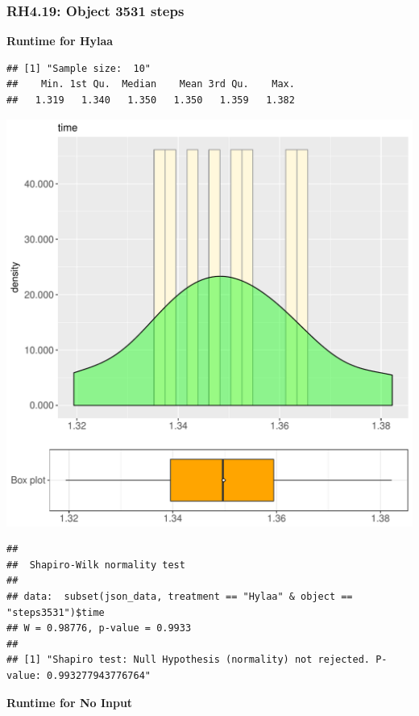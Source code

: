 \documentclass{article}\usepackage[]{graphicx}\usepackage[]{color}
\makeatletter
\def\maxwidth{ %
  \ifdim\Gin@nat@width>\linewidth
    \linewidth
  \else
    \Gin@nat@width
  \fi
}
\newenvironment{kframe}{%
 \def\at@end@of@kframe{}%
 \ifinner\ifhmode%
  \def\at@end@of@kframe{\end{minipage}}%
  \begin{minipage}{\columnwidth}%
 \fi\fi%
 \def\FrameCommand##1{\hskip\@totalleftmargin \hskip-\fboxsep
 \colorbox{shadecolor}{##1}\hskip-\fboxsep
     \hskip-\linewidth \hskip-\@totalleftmargin \hskip\columnwidth}%
 \MakeFramed {\advance\hsize-\width
   \@totalleftmargin\z@ \linewidth\hsize
   \@setminipage}}%
 {\par\unskip\endMakeFramed%
 \at@end@of@kframe}
\newenvironment{knitrout}{}{} %
\makeatother
\begin{document}
\subsubsection{RH4.19: Object 3531 steps}

 \textbf{Runtime for Hylaa}
\begin{knitrout}
\color{fgcolor}\begin{kframe}
\begin{verbatim}
## [1] "Sample size:  10"
##    Min. 1st Qu.  Median    Mean 3rd Qu.    Max. 
##   1.319   1.340   1.350   1.350   1.359   1.382
\end{verbatim}
\end{kframe}
\includegraphics[width=\maxwidth]{figure/RH4_Hylaa_steps3531-1} 
\begin{kframe}\begin{verbatim}
## 
## 	Shapiro-Wilk normality test
## 
## data:  subset(json_data, treatment == "Hylaa" & object == "steps3531")$time
## W = 0.98776, p-value = 0.9933
## 
## [1] "Shapiro test: Null Hypothesis (normality) not rejected. P-value: 0.993277943776764"
\end{verbatim}
\end{kframe}
\end{knitrout}
 \textbf{Runtime for No Input}
\end{document}
